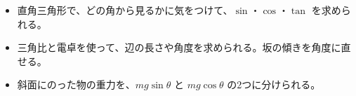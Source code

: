 \makeatletter
\newcommand\bkivgline[1]{\par\addvspace{3pt}{\centering #1\par}\addvspace{3pt}\noindent\ignorespaces}
\newcommand\bkivgstep[2]{\par\addvspace{6pt}\Needspace{4\baselineskip}\noindent
  {\bkcircled[bkOrange]{#1}\enspace\sffamily\bfseries\color{bkOrange!75!black}#2}\par\nobreak\vspace{2pt}}
\newcommand\bkivghead[1]{\par\addvspace{4pt}\Needspace{5\baselineskip}\noindent\textbf{#1}\par\nobreak}
\newcommand\bkivgbox[3]{\begin{scope}[shift={#1}, rotate=#2]
  \filldraw[fill=#3!35, draw=#3!70!black, line width=0.7pt, rounded corners=0.6mm] (-6,0) rectangle (6,9);
  \draw[#3!70!black, line width=0.5pt] (-6,6.2) -- (6,6.2);\end{scope}}
\newcommand\bkivgcart[3]{\begin{scope}[shift={#1}, rotate=#2]
  \filldraw[fill=bkGray!60, draw=bkInk, line width=0.5pt] (-3.6,1.4) circle (1.4) (3.6,1.4) circle (1.4);
  \filldraw[fill=#3!35, draw=#3!70!black, line width=0.7pt, rounded corners=0.6mm] (-6,2.8) rectangle (6,10.8);
  \draw[#3!70!black, line width=0.5pt] (-6,7.6) -- (6,7.6);\end{scope}}
\newcommand\bkivgright[3]{\draw[bkInk, line width=0.5pt] ($#1+(#2:#3)$) -- ++(#2+90:#3) -- ++(#2+180:#3);}
\makeatother


\begin{goal}
\begin{itemize}[label={\color{\bkTT}●}, leftmargin=1.6\zw, itemsep=0pt, topsep=1pt]
\item {}\enspace 直角三角形で、どの角から見るかに気をつけて、$\sin$・$\cos$・$\tan$ を求められる。
\item {}\enspace 三角比と電卓を使って、辺の長さや角度を求められる。坂の傾きを角度に直せる。
\item {}\enspace 斜面にのった物の重力を、$mg\sin\theta$ と $mg\cos\theta$ の2つに分けられる。
\end{itemize}
\end{goal}

